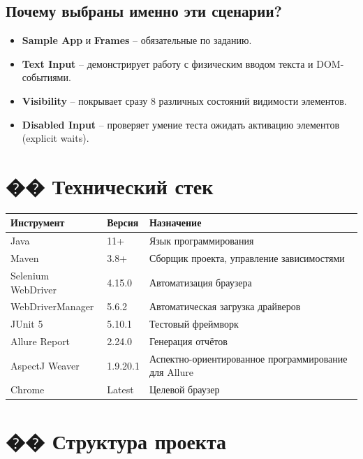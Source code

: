 \documentclass[12pt,a4paper]{article}
\begin{document}
\subsection*{Почему выбраны именно эти сценарии?}
\begin{itemize}
\item \textbf{Sample App} и \textbf{Frames} -- обязательные по заданию.
\item \textbf{Text Input} -- демонстрирует работу с физическим вводом текста и DOM-событиями.
\item \textbf{Visibility} -- покрывает сразу 8 различных состояний видимости элементов.
\item \textbf{Disabled Input} -- проверяет умение теста ожидать активацию элементов (explicit waits).
\end{itemize}

\section{�� Технический стек}

\begin{table}[h!]
\centering
\begin{tabular}{p{4cm} p{3cm} p{5cm}}
\toprule
\textbf{Инструмент} & \textbf{Версия} & \textbf{Назначение} \\
\midrule
Java & 11+ & Язык программирования \\
Maven & 3.8+ & Сборщик проекта, управление зависимостями \\
Selenium WebDriver & 4.15.0 & Автоматизация браузера \\
WebDriverManager & 5.6.2 & Автоматическая загрузка драйверов \\
JUnit 5 & 5.10.1 & Тестовый фреймворк \\
Allure Report & 2.24.0 & Генерация отчётов \\
AspectJ Weaver & 1.9.20.1 & Аспектно-ориентированное программирование для Allure \\
Chrome & Latest & Целевой браузер \\
\bottomrule
\end{tabular}
\end{table}

\section{�� Структура проекта}
\end{document}

